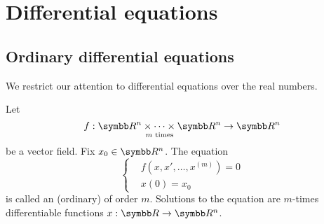 \section{Differential equations}\label{sec:diffeq}
\subsection{Ordinary differential equations}\label{subsec:ordinary_differential_equations}

\begin{remark}\label{remark:real_ode}
  We restrict our attention to differential equations over the real numbers.
\end{remark}

\begin{definition}\label{def:ode}
  Let
  \begin{equation*}
    f: \underset {m \text{ times}} {\BR^n \times \cdots \times \BR^n} \to \BR^n
  \end{equation*}
  be a vector field. Fix \( x_0 \in \BR^n \). The equation
  \begin{equation*}
    \begin{cases}
      &f(x, x', \ldots, x^{(m)}) = 0 \\
      &x(0) = x_0
    \end{cases}
  \end{equation*}
  is called an (ordinary)  of order \( m \). Solutions to the equation are \( m \)-times differentiable functions \( x: \BR \to \BB{R^n} \).
\end{definition}
